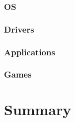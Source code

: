 \documentclass[%
final,
xcolor = table,
usenames,
dvipsnames,
table,
aspectratio = 169]{beamer}
\begin{document}
\subsubsection{OS}

\subsubsection{Drivers}

\subsubsection{Applications}


\subsubsection{Games}


\section{Summary}


\appendix


\end{document}
